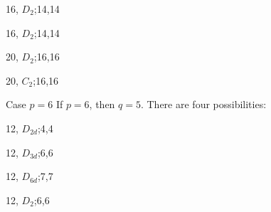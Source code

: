 \documentclass[%
pdf,
colorBG,
slideColor,
]{prosper}
\begin{document}
\begin{slide}{}
\begin{center}
\hspace{1cm}\begin{minipage}{3.5cm}
\centering
\epsfxsize=3.5cm
\par
16, $D_2$;14,14
\end{minipage}
\hfill\begin{minipage}{3.5cm}
\centering
\epsfxsize=3.5cm
\par
16, $D_2$;14,14
\end{minipage}\hspace{1cm}

\hspace{1cm}\begin{minipage}{3.5cm}
\centering
\epsfxsize=3.5cm
\par
20, $D_2$;16,16
\end{minipage}
\hfill\begin{minipage}{3.5cm}
\centering
\epsfxsize=3.5cm
\par
20, $C_2$;16,16
\end{minipage}\hspace{1cm}

\end{center}



\end{slide}






\begin{slide}{Case $p=6$}
If $p=6$, then $q=5$. There are four possibilities:

\begin{center}
\begin{minipage}{5cm}
\centering
{}\par
12, $D_{2d}$;4,4
\end{minipage}
\begin{minipage}{5cm}
\centering
{}\par
12, $D_{3d}$;6,6
\end{minipage}
\begin{minipage}{5cm}
\centering
{}\par
12, $D_{6d}$;7,7
\end{minipage}
\begin{minipage}{5cm}
\centering
{}\par
12, $D_2$;6,6
\end{minipage}



\end{center}

\end{slide}
\end{document}

